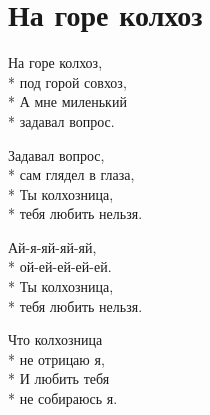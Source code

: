 \vspace{\fill}\newpage

\section{На горе колхоз}
\label{song:На_горе_колхоз}

\medskip

\begin{minipage}{\linewidth}
На горе колхоз,\\*
под горой совхоз,\\*
А мне миленький\\*
задавал вопрос.\\
\end{minipage}\par\medskip\nobreak

\medskip

\begin{minipage}{\linewidth}
Задавал вопрос,\\*
сам глядел в глаза,\\*
Ты колхозница,\\*
тебя любить нельзя.\\
\end{minipage}\par\medskip\nobreak

\medskip

\begin{minipage}{\linewidth}
\hspace*{1.5em}Ай-я-яй-яй-яй,\\*
\hspace*{1.5em}ой-ей-ей-ей-ей.\\*
\hspace*{1.5em}Ты колхозница,\\*
\hspace*{1.5em}тебя любить нельзя.\\
\end{minipage}\par\medskip\nobreak

\medskip

\begin{minipage}{\linewidth}
Что колхозница\\*
не отрицаю я,\\*
И любить тебя\\*
не собираюсь я.\\
\end{minipage}\par\medskip\nobreak

